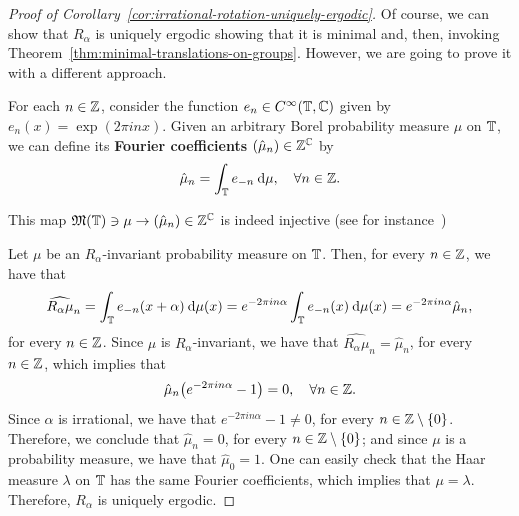 \begin{proof}[Proof of Corollary~\ref{cor:irrational-rotation-uniquely-ergodic}]
  Of course, we can show that $R_\alpha$ is uniquely ergodic showing that it is minimal and, then, invoking Theorem~\ref{thm:minimal-translations-on-groups}. However, we are going to prove it with a different approach.

  For each $n\in\mathbb{Z}$, consider the function $e_n\in C^\infty(\mathbb{T},\mathbb{C})$ given by $e_n(x)=\exp(2\pi i nx)$. Given an arbitrary Borel probability measure $\mu$ on $\mathbb{T}$, we can define its \textbf{Fourier coefficients} $(\hat\mu_n)\in\mathbb{Z}^{\mathbb{C}}$ by
  \begin{displaymath}
    \hat\mu_n=\int_{\mathbb{T}} e_{-n}\:\mathrm{d}\mu,\quad\forall n\in\mathbb{Z}.
  \end{displaymath}

  This map $\operatorname{\mathfrak{M}}(\mathbb{T})\ni\mu \to (\hat\mu_n)\in\mathbb{Z}^{\mathbb{C}}$ is indeed injective (see for instance~\cite[\S1.7]{KatznelsonHarmonicAnalysis})

  Let $\mu$ be an $R_\alpha$-invariant probability measure on $\mathbb{T}$. Then, for every $n\in\mathbb{Z}$, we have that
  \begin{displaymath}
    \widehat{R_\alpha\mu}_n=\int_{\mathbb{T}} e_{-n}(x+\alpha)\:\mathrm{d}\mu(x)=e^{-2\pi i n\alpha}\int_{\mathbb{T}} e_{-n}(x)\:\mathrm{d}\mu(x) = e^{-2\pi i n\alpha}\hat\mu_n,
  \end{displaymath}
  for every $n\in\mathbb{Z}$. Since $\mu$ is $R_\alpha$-invariant, we have that $\widehat{R_\alpha\mu}_n=\hat\mu_n$, for every $n\in\mathbb{Z}$, which implies that
  \begin{displaymath}
    \hat\mu_n\big(e^{-2\pi i n\alpha}-1\big)=0,\quad\forall n\in\mathbb{Z}.
  \end{displaymath}
  Since $\alpha$ is irrational, we have that $e^{-2\pi i n\alpha}-1\neq 0$, for every $n\in\mathbb{Z}\setminus\{0\}$. Therefore, we conclude that $\hat\mu_n=0$, for every $n\in\mathbb{Z}\setminus\{0\}$; and since $\mu$ is a probability measure, we have that $\hat\mu_0=1$. One can easily check that the Haar measure $\lambda$ on $\mathbb{T}$ has the same Fourier coefficients, which implies that $\mu=\lambda$. Therefore, $R_\alpha$ is uniquely ergodic.
\end{proof}
